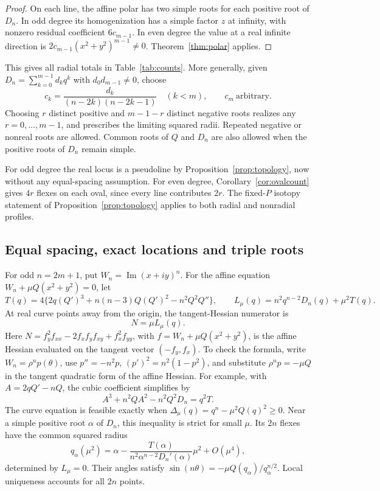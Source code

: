 \documentclass[11pt,a4paper]{article}
\theoremstyle{remark}
\newcommand{\im}{\operatorname{Im}}
\begin{document}
\begin{proof}
On each line, the affine polar has two simple roots for each
positive root of \(D_n\). In odd degree its homogenization has
a simple factor \(z\) at infinity, with nonzero residual
coefficient \(6c_{m-1}\). In even degree the value at a real
infinite direction is \(2c_{m-1}(x^2+y^2)^{m-1}\ne0\).
Theorem~\ref{thm:polar} applies.
\end{proof}

This gives all radial totals in Table~\ref{tab:counts}. More
generally, given \(D_n=\sum_{k=0}^{m-1}d_kq^k\) with
\(d_0d_{m-1}\ne0\), choose
\begin{equation}\label{eq:radialinverse}
 c_k=\frac{d_k}{(n-2k)(n-2k-1)}\quad(k<m),\qquad
 c_m\ \text{arbitrary}.
\end{equation}
Choosing \(r\) distinct positive and \(m-1-r\) distinct negative
roots realizes any \(r=0,\ldots,m-1\), and prescribes the
limiting squared radii. Repeated negative or nonreal roots are
allowed. Common roots of \(Q\) and \(D_n\) are also allowed when
the positive roots of \(D_n\) remain simple.

For odd degree the real locus is a pseudoline by
Proposition~\ref{prop:topology}, now without any equal-spacing
assumption. For even degree, Corollary~\ref{cor:ovalcount}
gives \(4r\) flexes on each oval, since every line contributes
\(2r\). The fixed-\(P\) isotopy statement of
Proposition~\ref{prop:topology} applies to both radial and
nonradial profiles.

\subsection{Equal spacing, exact locations and triple roots}

For odd \(n=2m+1\), put \(W_n=\im(x+iy)^n\).
For the affine equation \(W_n+\mu Q(x^2+y^2)=0\), let
\[
 T(q)=4\{2q(Q')^3+n(n-3)Q(Q')^2-n^2Q^2Q''\},\qquad
 L_\mu(q)=n^2q^{n-2}D_n(q)+\mu^2T(q).
\]
At real curve points away from the origin, the tangent-Hessian
numerator is
\begin{equation}\label{eq:sectoralK}
                          N=\mu L_\mu(q).
\end{equation}
Here \(N=f_y^2f_{xx}-2f_xf_yf_{xy}+f_x^2f_{yy}\), with
\(f=W_n+\mu Q(x^2+y^2)\), is the affine Hessian evaluated
on the tangent vector \((-f_y,f_x)\).
To check the formula, write \(W_n=\rho^np(\theta)\),
use \(p''=-n^2p\), \((p')^2=n^2(1-p^2)\), and substitute
\(\rho^np=-\mu Q\) in the tangent quadratic form of the
affine Hessian. For example, with \(A=2qQ'-nQ\), the cubic
coefficient simplifies by
\[
             A^3+n^2QA^2-n^2Q^2D_n=q^2T.
\]
The curve equation is feasible exactly when
\(\Delta_\mu(q)=q^n-\mu^2Q(q)^2\geq0\).
Near a simple positive root \(\alpha\) of \(D_n\), this
inequality is strict for small \(\mu\). Its \(2n\) flexes
have the common squared radius
\begin{equation}\label{eq:radialdrift}
 q_\alpha(\mu^2)=\alpha-
   \frac{T(\alpha)}{n^2\alpha^{n-2}D_n'(\alpha)}\mu^2+O(\mu^4),
\end{equation}
determined by \(L_\mu=0\). Their angles satisfy
\(\sin(n\theta)=-\mu Q(q_\alpha)/q_\alpha^{n/2}\).
Local uniqueness accounts for all \(2n\) points.
\end{document}
